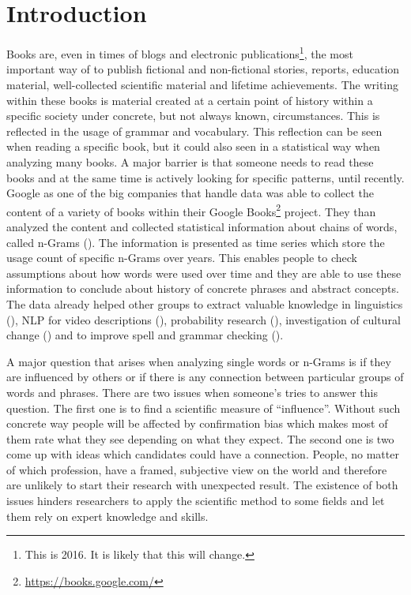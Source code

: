 \chapter{Introduction}
\label{ch:Introduction}

Books are, even in times of blogs and electronic publications\footnote{This is 2016. It is likely that this will change.}, the most important way of to publish fictional and non-fictional stories, reports, education material, well-collected scientific material and lifetime achievements. The writing within these books is material created at a certain point of history within a specific society under concrete, but not always known, circumstances. This is reflected in the usage of grammar and vocabulary. This reflection can be seen when reading a specific book, but it could also seen in a statistical way when analyzing many books. A major barrier is that someone needs to read these books and at the same time is actively looking for specific patterns, until recently. Google as one of the big companies that handle data was able to collect the content of a variety of books within their Google Books\footnote{\url{https://books.google.com/}} project. They than analyzed the content and collected statistical information about chains of words, called n-Grams (\cite{Google_nGrams}). The information is presented as time series which store the usage count of specific n-Grams over years. This enables people to check assumptions about how words were used over time and they are able to use these information to conclude about history of concrete phrases and abstract concepts. The data already helped other groups to extract valuable knowledge in linguistics (\cite{others1,others5,others7}), NLP for video descriptions (\cite{others2}), probability research (\cite{others3,others6}), investigation of cultural change (\cite{others4}) and to improve spell and grammar checking (\cite{languagetool}).

A major question that arises when analyzing single words or n-Grams is if they are influenced by others or if there is any connection between particular groups of words and phrases. There are two issues when someone's tries to answer this question. The first one is to find a scientific measure of \enquote{influence}. Without such concrete way people will be affected by confirmation bias which makes most of them rate what they see depending on what they expect. The second one is two come up with ideas which candidates could have a connection. People, no matter of which profession, have a framed, subjective view on the world and therefore are unlikely to start their research with unexpected result. The existence of both issues hinders researchers to apply the scientific method to some fields and let them rely on expert knowledge and skills.

